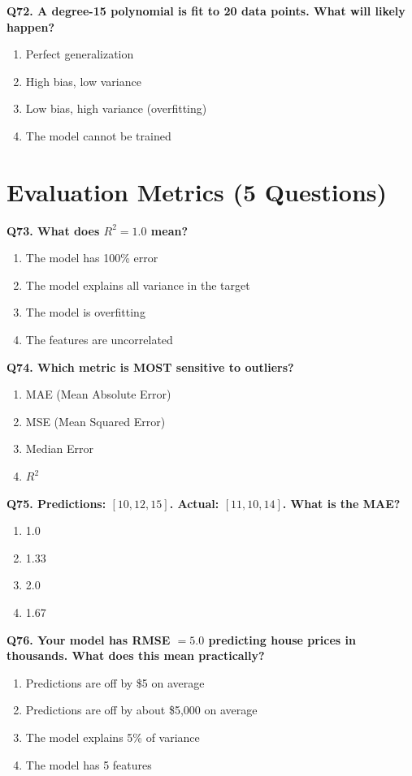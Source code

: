 \documentclass[12pt, a4paper]{article}
\newcommand{\question}[1]{\vspace{0.6em}\noindent\textbf{#1}}
\begin{document}
\question{Q72. A degree-15 polynomial is fit to 20 data points. What will likely happen?}
\begin{enumerate}[label=\alph*)]
    \item Perfect generalization
    \item High bias, low variance
    \item Low bias, high variance (overfitting)
    \item The model cannot be trained
\end{enumerate}

\section{Evaluation Metrics (5 Questions)}

\question{Q73. What does $R^2 = 1.0$ mean?}
\begin{enumerate}[label=\alph*)]
    \item The model has 100\% error
    \item The model explains all variance in the target
    \item The model is overfitting
    \item The features are uncorrelated
\end{enumerate}

\question{Q74. Which metric is MOST sensitive to outliers?}
\begin{enumerate}[label=\alph*)]
    \item MAE (Mean Absolute Error)
    \item MSE (Mean Squared Error)
    \item Median Error
    \item $R^2$
\end{enumerate}

\question{Q75. Predictions: $[10, 12, 15]$. Actual: $[11, 10, 14]$. What is the MAE?}
\begin{enumerate}[label=\alph*)]
    \item 1.0
    \item 1.33
    \item 2.0
    \item 1.67
\end{enumerate}

\question{Q76. Your model has RMSE $= 5.0$ predicting house prices in thousands. What does this mean practically?}
\begin{enumerate}[label=\alph*)]
    \item Predictions are off by \$5 on average
    \item Predictions are off by about \$5,000 on average
    \item The model explains 5\% of variance
    \item The model has 5 features
\end{enumerate}
\end{document}
